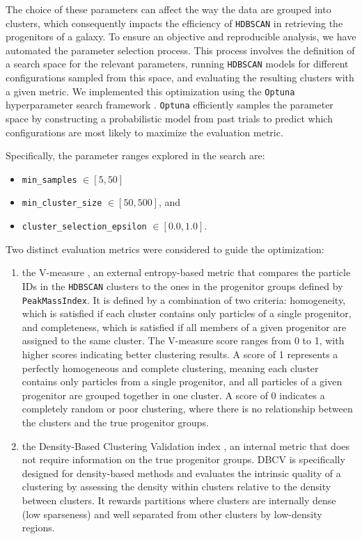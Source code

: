 The choice of these parameters can affect the way the data are grouped into clusters, which consequently impacts the efficiency of \texttt{HDBSCAN} in retrieving the progenitors of a galaxy.  To ensure an objective and reproducible analysis, we have automated the parameter selection process. This process involves the definition of a search space for the relevant parameters, running \texttt{HDBSCAN} models for different configurations sampled from this space, and evaluating the resulting clusters with a given metric. We implemented this optimization using the \texttt{Optuna} hyperparameter search framework \citep{Akiba2019}. \texttt{Optuna} efficiently samples the parameter space by constructing a probabilistic model from past trials to predict which configurations are most likely to maximize the evaluation metric.

Specifically, the parameter ranges explored in the search are:
\begin{itemize}

\item \texttt{min\_samples} $\in [5, 50]$
\item \texttt{min\_cluster\_size} $\in [50, 500]$, and
\item \texttt{cluster\_selection\_epsilon} $\in [0.0, 1.0]$.
\end{itemize}

Two distinct evaluation metrics were considered to guide the optimization:
\begin{enumerate}
\item the V-measure \citep{Rosenberg2007}, an external entropy-based metric that compares the particle IDs in the \texttt{HDBSCAN} clusters to the ones in the  progenitor groups defined by \texttt{PeakMassIndex}. It is defined by a combination of two criteria: homogeneity, which is satisfied if each cluster contains only particles of a single progenitor, and completeness, which is satisfied if all members of a given progenitor are assigned to the same cluster. The V-measure score ranges from 0 to 1, with higher scores indicating better clustering results. A score of 1 represents a perfectly homogeneous and complete clustering, meaning each cluster contains only particles from a single progenitor, and all particles of a given progenitor are grouped together in one cluster. A score of 0 indicates a completely random or poor clustering, where there is no relationship between the clusters and the true progenitor groups.

\item the Density-Based Clustering Validation index \citep[DBCV,][]{Moulavi2014}, an internal metric that does not require information on the true progenitor groups. DBCV is specifically designed for density-based methods and evaluates the intrinsic quality of a clustering by assessing the density within clusters relative to the density between clusters. It rewards partitions where clusters are internally dense (low sparseness) and well separated from other clusters by low-density regions.
\end{enumerate}

